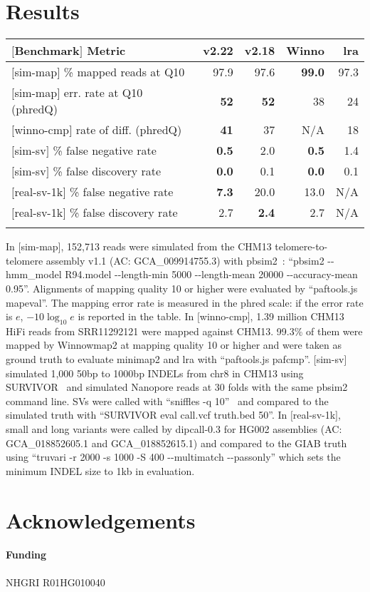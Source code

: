 \documentclass{bioinfo}
\begin{document}
\section{Results}

\begin{table}
{\footnotesize\begin{tabular}{p{4.2cm}rrrr}
\toprule
$[$Benchmark$]$ Metric & v2.22 & v2.18 & Winno & lra \\
\midrule
$[$sim-map$]$ \% mapped reads at Q10      & 97.9 & 97.6 & {\bf 99.0} & 97.3 \\
$[$sim-map$]$ err. rate at Q10 (phredQ)   & {\bf 52}   & {\bf 52}   & 38   & 24 \\
$[$winno-cmp$]$  rate of diff. (phredQ)   & {\bf 41}   & 37   & N/A  & 18 \\
$[$sim-sv$]$  \% false negative rate      & {\bf 0.5}  & 2.0  & {\bf 0.5}  & 1.4  \\
$[$sim-sv$]$  \% false discovery rate     & {\bf 0.0}  & 0.1  & {\bf 0.0}  & 0.1  \\
$[$real-sv-1k$]$ \% false negative rate   & {\bf 7.3}  & 20.0 & 13.0 & N/A \\
$[$real-sv-1k$]$ \% false discovery rate  & 2.7  & {\bf 2.4}  & 2.7  & N/A \\
\botrule
\end{tabular}}
{In $[$sim-map$]$, 152,713 reads were simulated from the CHM13 telomere-to-telomere assembly v1.1
(AC: GCA\_009914755.3) with pbsim2~\citep{Ono:2021aa}: ``pbsim2 -{}-hmm\_model R94.model -{}-length-min
5000 -{}-length-mean 20000 -{}-accuracy-mean 0.95''. Alignments of mapping quality
10 or higher were evaluated by ``paftools.js mapeval''. The mapping error rate
is measured in the phred scale: if the error rate is $e$, $-10\log_{10}e$ is
reported in the table. In $[$winno-cmp$]$, 1.39 million CHM13 HiFi reads from
SRR11292121 were mapped against CHM13. 99.3\% of them were mapped by Winnowmap2
at mapping quality 10 or higher and were taken as ground truth to evaluate
minimap2 and lra with ``paftools.js pafcmp''. $[$sim-sv$]$ simulated 1,000
50bp to 1000bp INDELs from chr8 in CHM13 using SURVIVOR~\citep{Jeffares:2017aa} and simulated Nanopore
reads at 30 folds with the same pbsim2 command line. SVs were called with
``sniffles -q 10''~\citep{Sedlazeck:2018ab} and compared to the simulated truth with ``SURVIVOR eval
call.vcf truth.bed 50''. In $[$real-sv-1k$]$, small and long variants were
called by dipcall-0.3 for HG002 assemblies (AC: GCA\_018852605.1 and
GCA\_018852615.1) and compared to the GIAB truth~\citep{Zook:2020aa} using ``truvari -r 2000 -s
1000 -S 400 -{}-multimatch -{}-passonly'' which sets the minimum INDEL size to 1kb in evaluation. }
\end{table}

\section*{Acknowledgements}

\paragraph{Funding\textcolon} NHGRI R01HG010040


\end{document}
